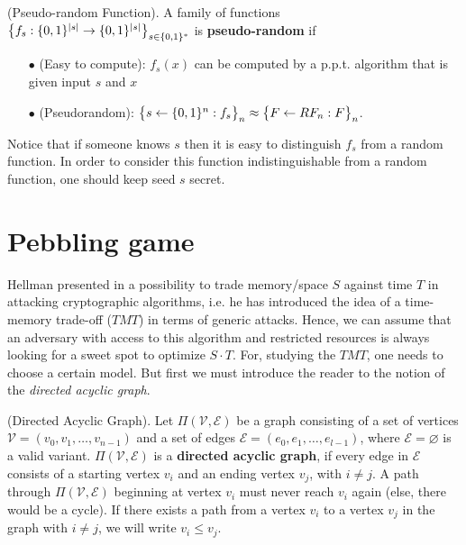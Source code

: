 \begin{definition}{(Pseudo-random Function).} \textnormal{\cite{ACI}}
  A family of functions $\big{\{} f_s: \{ 0,1 \}^{\lvert s \rvert} \rightarrow \{ 0,1 \}^{\lvert s \rvert} \big{\}}_{s \in \{ 0,1 \}^{*}}$ is \textbf{pseudo-random} if
  \begin{itemize}
    \item[$\bullet$] (Easy to compute): $f_s(x)$ can be computed by a p.p.t. algorithm that is given input $s$ and $x$
    \item[$\bullet$] (Pseudorandom): $\big{\{} s \leftarrow \{ 0,1 \}^n: f_s \big{\}}_n \approx \big{\{} F \leftarrow RF_n: F \big{\}}_n$.
  \end{itemize}
\end{definition}
Notice that if someone knows $s$ then it is easy to distinguish $f_s$ from a random function. In order to consider this function indistinguishable from a random function, one should keep seed $s$ secret.
%

\section{Pebbling game}
Hellman presented in \cite{Hellman:2006:CTT:2263346.2269686} a possibility to trade memory/space $S$ against time $T$ in attacking cryptographic algorithms, i.e. he has introduced the idea of a time-memory trade-off ($TMT$) in terms of generic attacks. Hence, we can assume that an adversary with access to this algorithm and restricted resources is always looking for a sweet spot to optimize $S \cdot T$. For, studying the $TMT$, one needs to choose a certain model. But first we must introduce the reader to the notion of the \textit{directed acyclic graph}.

\begin{definition}{(Directed Acyclic Graph).}\textnormal{\cite{ForlerLW13}}
  Let $\Pi(\mathcal{V},\mathcal{E})$ be a graph consisting of a set of vertices $\mathcal{V}=(v_0,v_1,\dots,v_{n-1})$ and a set of edges $\mathcal{E}=(e_0,e_1,\dots,e_{l-1})$, where $\mathcal{E}=\varnothing$ is a valid variant. $\Pi(\mathcal{V},\mathcal{E})$ is a \textbf{directed acyclic graph}, if every edge in $\mathcal{E}$
  consists of a starting vertex $v_i$ and an ending vertex $v_j$, with $i \neq j$. A path through $\Pi(\mathcal{V},\mathcal{E})$ beginning at vertex $v_i$ must never reach $v_i$ again (else, there would be a cycle). If there exists a path from a vertex $v_i$ to a vertex $v_j$ in the graph with $i \neq j$, we will write $v_i \leq v_j$.
\end{definition}


